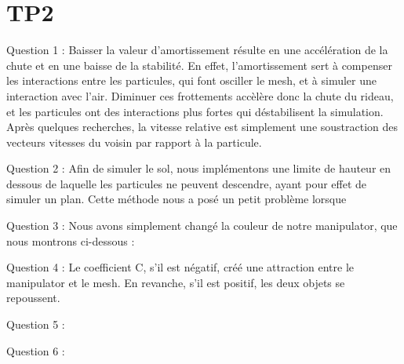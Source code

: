 \documentclass[a4paper,12pt]{article}
\begin{document}
\section{TP2}

Question 1 : Baisser la valeur d'amortissement résulte en une accélération de la chute et en une baisse de la stabilité. En effet, l'amortissement sert à compenser les interactions entre les particules, qui font osciller le mesh, et à simuler une interaction avec l'air. Diminuer ces \og{}frottements\fg{} accèlère donc la chute du rideau, et les particules ont des interactions plus fortes qui déstabilisent la simulation. Après quelques recherches, la vitesse relative est simplement une soustraction des vecteurs vitesses du voisin par rapport à la particule.

Question 2 : Afin de simuler le sol, nous implémentons une limite de hauteur en dessous de laquelle les particules ne peuvent descendre, ayant pour effet de simuler un plan. Cette méthode nous a posé un petit problème lorsque 


Question 3 : Nous avons simplement changé la couleur de notre manipulator, que nous montrons ci-dessous : %


Question 4 : Le coefficient C, s'il est négatif, créé une attraction entre le manipulator et le mesh. En revanche, s'il est positif, les deux objets se repoussent.

Question 5 : %

Question 6 :%
\end{document}
